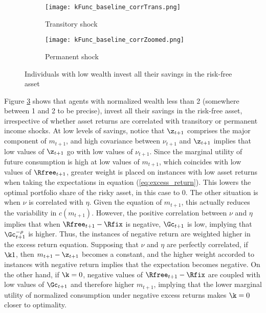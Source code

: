 \begin{figure}[h]
    \centering
    \begin{subfigure}{0.49\textwidth}
        \centering
        \texttt{[image: kFunc\_baseline\_corrTrans.png]}
        \caption{Transitory shock}
        \label{subfig:correlated_poor_transitory}        
    \end{subfigure}
    \begin{subfigure}{0.49\textwidth}
        \centering
        \texttt{[image: kFunc\_baseline\_corrZoomed.png]}
        \caption{Permanent shock}
        \label{subfig:correlated_poor_permanent}
    \end{subfigure}
    \caption{Individuals with low wealth invest all their savings in the risk-free asset}
    \label{fig:baseline_correlated_poor}
\end{figure}

Figure \ref{fig:baseline_correlated_poor} shows that agents with normalized wealth less than 2 (somewhere between 1 and 2 to be precise), invest all their savings in the risk-free asset, irrespective of whether asset returns are correlated with transitory or permanent income shocks. At low levels of savings, notice that $\z_{t+1}$ comprises the major component of $m_{t+1}$, and high covariance between $\nu_{t+1}$ and $\z_{t+1}$ implies that low values of $\z_{t+1}$ go with low values of $\nu_{t+1}$. Since the marginal utility of future consumption is high at low values of $m_{t+1}$, which coincides with low values of $\Rfree_{t+1}$, greater weight is placed on instances with low asset returns when taking the expectations in equation (\ref{eq:excess_return}). This lowers the optimal portfolio share of the risky asset, in this case to 0. The other situation is when $\nu$ is correlated with $\eta$. Given the equation of $m_{t+1}$, this actually reduces the variability in $c(m_{t+1})$. However, the positive correlation between $\nu$ and $\eta$ implies that when $\Rfree_{t+1} - \Rfix$ is negative, $\Gc_{t+1}$ is low, implying that $\Gc_{t+1}^{-\rho}$ is higher. Thus, the instances of negative return are weighted higher in the excess return equation. Supposing that $\nu$ and $\eta$ are perfectly correlated, if $\k  1$, then $m_{t+1} - \z_{t+1}$ becomes a constant, and the higher weight accorded to instances with negative return implies that the expectation becomes negative. On the other hand, if $\k = 0$, negative values of $\Rfree_{t+1} - \Rfix$ are coupled with low values of $\Gc_{t+1}$ and therefore higher $m_{t+1}$, implying that the lower marginal utility of normalized consumption under negative excess returns makes $\k = 0$ closer to optimality.

